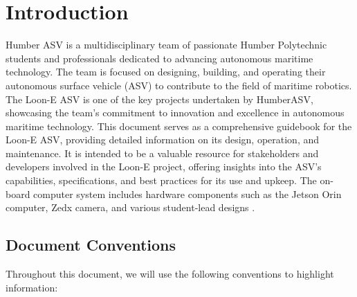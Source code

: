 %
%
%
%

\section{Introduction}
Humber ASV is a multidisciplinary team of passionate Humber Polytechnic students and professionals dedicated to advancing autonomous maritime technology.\autocite{HUMBERASVTEAM} 
The team is focused on designing, building, and operating their autonomous surface vehicle (ASV) to contribute to the field of maritime robotics. 
The Loon-E ASV is one of the key projects undertaken by HumberASV, showcasing the team's commitment to innovation and excellence in autonomous maritime technology.\autocite{HUMBERASVTEAM} 
This document serves as a comprehensive guidebook for the Loon-E ASV, providing detailed information on its design, operation, and maintenance. 
It is intended to be a valuable resource for stakeholders and developers involved in the Loon-E project, offering insights into the ASV's capabilities, specifications, and best practices for its use and upkeep.
The on-board computer system includes hardware components such as the Jetson Orin computer, Zedx camera, and various student-lead designs \autocite{HUMBERASVREPORT2026}. 

\subsection{Document Conventions}
Throughout this document, we will use the following conventions to highlight information:

